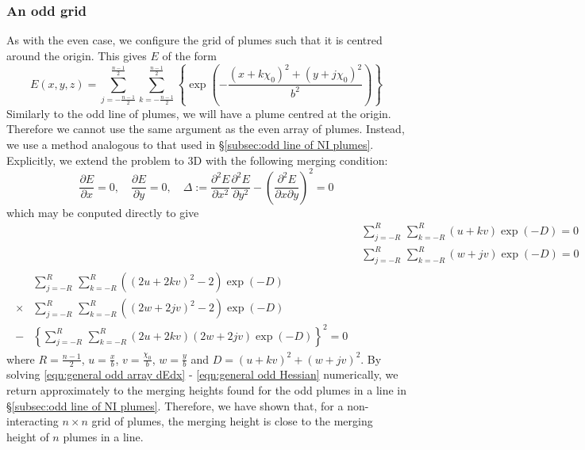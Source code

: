 \documentclass{jfm}
\newcommand{\pddx}[1]{\dfrac{\partial #1}{\partial x}} %
\newcommand{\pddy}[1]{\dfrac{\partial #1}{\partial y}} %
\begin{document}
	\subsubsection{An odd grid}
	As with the even case, we configure the grid of plumes such that it is centred around the origin. This gives $E$ of the form
	\begin{equation}
		E(x,y,z) = \displaystyle{\sum_{j=-\frac{n-1}{2}}^{\frac{n-1}{2}}\sum_{k=-\frac{n-1}{2}}^{\frac{n-1}{2}}\left\{\exp\left(-\frac{(x+k\chi_0)^2 + (y+j\chi_0)^2}{b^2}\right)\right\}}\label{eqn:odd grid system}
	\end{equation}
	Similarly to the odd line of plumes, we will have a plume centred at the origin. Therefore we cannot use the same argument as the even array of plumes. Instead, we use a method analogous to that used in \S\ref{subsec:odd line of NI plumes}. Explicitly, we extend the problem to 3D with the following merging condition:
	\begin{equation}
		\pddx{E} = 0, \quad
		\pddy{E} = 0, \quad
		\Delta := \frac{\partial^2E}{\partial x^2}\frac{\partial^2E}{\partial y^2} - \left(\frac{\partial^2E}{\partial x \partial y}\right)^2 = 0 \label{eqn:odd array merging criteria}
	\end{equation}
	which may be conputed directly to give 
	\begin{align}
		{}&\displaystyle{\sum_{j = -R}^{R}\, \sum_{k = -R}^{R} (u+kv)\exp \left(-D\right)} = 0 \label{eqn:general odd array dEdx} \\
		{}&\displaystyle{\sum_{j = -R}^{R}\, \sum_{k = -R}^{R} (w+jv)\exp \left(-D\right)} = 0 \label{eqn:general odd array dEdy}\\
		\begin{split} \label{eqn:general odd Hessian}
		{}&\displaystyle{\sum_{j = -R}^{R}\, \sum_{k = -R}^{R} \left((2u+2kv)^2-2\right)\exp \left(-D\right)} \\
		\times {}&\displaystyle{\sum_{j = -R}^{R}\, \sum_{k = -R}^{R} \left((2w+2jv)^2-2\right)\exp \left(-D\right)}\\
		- {}& \left\{\displaystyle{\sum_{j = -R}^{R}\, \sum_{k = -R}^{R} (2u+2kv)(2w+2jv)\exp \left(-D\right)}\right\}^2 = 0
		\end{split}
	\end{align}
	where $R = \tfrac{n-1}{2}$, $u = \frac{x}{b}$, $v = \frac{\chi_0}{b}$, $w = \frac{y}{b}$ and $D = (u+kv)^2 + (w+jv)^2$. By solving \eqref{eqn:general odd array dEdx} - \eqref{eqn:general odd Hessian} numerically, we return approximately to the merging heights found for the odd plumes in a line in \S\ref{subsec:odd line of NI plumes}. Therefore, we have shown that, for a non-interacting $n\times n$ grid of plumes, the merging height is close to the merging height of $n$ plumes in a line.
\end{document}
